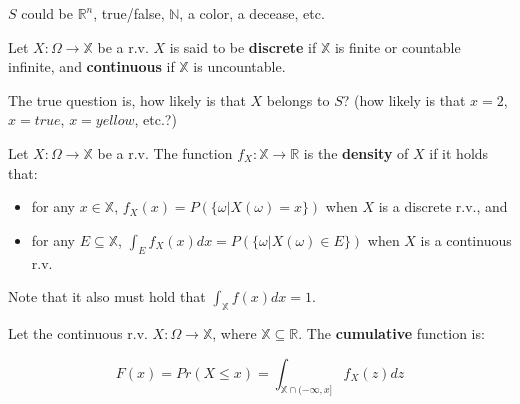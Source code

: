 \documentclass[aspectratio=169]{beamer}
\begin{document}
\begin{frame}
    $S$ could be $\mathbb{R}^n$, true/false, $\mathbb{N}$, a color, a decease, etc.\pause
    
    \vspace{0.5cm}
    
    \begin{definition}
        Let $X:\Omega\rightarrow\mathbb{X}$ be a r.v. $X$ is said to be \textbf{discrete} if $\mathbb{X}$ is finite or countable infinite, and \textbf{continuous} if $\mathbb{X}$ is uncountable.
    \end{definition}
    
    \vspace{0.5cm}
    
    The true question is, how likely is that $X$ belongs to $S$? (how likely is that $x=2$, $x=true$, $x=yellow$, etc.?)
\end{frame}

\begin{frame}
    \begin{definition}
        Let $X:\Omega\rightarrow\mathbb{X}$ be a r.v. The function $f_X:\mathbb{X}\rightarrow\mathbb{R}$ is the \textbf{density} of $X$ if it holds that:
        \vspace{0.3cm}

        \begin{itemize}
            \item for any $x\in\mathbb{X}$, $f_X(x)=P(\{\omega|X(\omega)=x\})$ when $X$ is a discrete r.v., and
            \vspace{0.3cm}
            \item for any $E\subseteq \mathbb{X}$, $\int_E f_X(x)dx=P(\{\omega|X(\omega)\in E\})$ when $X$ is a continuous r.v.
        \end{itemize}
        
    \end{definition}
    
    Note that it also must hold that $\int_\mathbb{X} f(x)dx=1$.
\end{frame}

\begin{frame}
    \begin{definition}
    Let the continuous r.v. $X:\Omega\rightarrow \mathbb{X}$, where $\mathbb{X}\subseteq\mathbb{R}$. The \textbf{cumulative} function is:
    
    $$F(x) = Pr(X\leq x) = \int_{\mathbb{X}\cap(-\infty,x]}f_X(z)dz$$
    \end{definition}
\end{frame}
\end{document}
